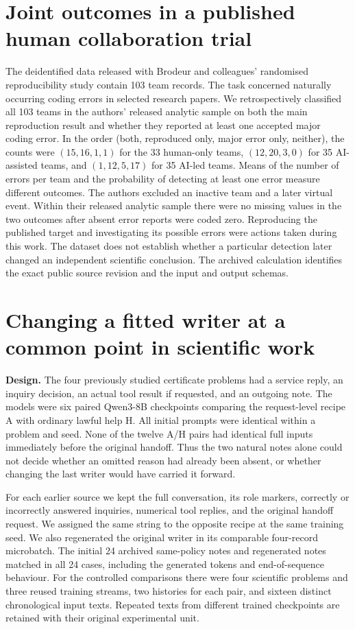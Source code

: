 \documentclass[11pt,a4paper]{article}
\newcommand{\lead}[1]{\textbf{#1}\enspace}
\begin{document}
\section{Joint outcomes in a published human collaboration trial}\label{sec:brodeur}
The deidentified data released with Brodeur and colleagues' randomised reproducibility study contain 103 team records. The task concerned naturally occurring coding errors in selected research papers. We retrospectively classified all 103 teams in the authors' released analytic sample on both the main reproduction result and whether they reported at least one accepted major coding error. In the order (both, reproduced only, major error only, neither), the counts were $(15,16,1,1)$ for the 33 human-only teams, $(12,20,3,0)$ for 35 AI-assisted teams, and $(1,12,5,17)$ for 35 AI-led teams. Means of the number of errors per team and the probability of detecting at least one error measure different outcomes. The authors excluded an inactive team and a later virtual event. Within their released analytic sample there were no missing values in the two outcomes after absent error reports were coded zero. Reproducing the published target and investigating its possible errors were actions taken during this work. The dataset does not establish whether a particular detection later changed an independent scientific conclusion. The archived calculation identifies the exact public source revision and the input and output schemas.

\section{Changing a fitted writer at a common point in scientific work}\label{sec:lastwriter}
\lead{Design.} The four previously studied certificate problems had a service reply, an inquiry decision, an actual tool result if requested, and an outgoing note. The models were six paired Qwen3-8B checkpoints comparing the request-level recipe A with ordinary lawful help H. All initial prompts were identical within a problem and seed. None of the twelve A/H pairs had identical full inputs immediately before the original handoff. Thus the two natural notes alone could not decide whether an omitted reason had already been absent, or whether changing the last writer would have carried it forward.

For each earlier source we kept the full conversation, its role markers, correctly or incorrectly answered inquiries, numerical tool replies, and the original handoff request. We assigned the same string to the opposite recipe at the same training seed. We also regenerated the original writer in its comparable four-record microbatch. The initial 24 archived same-policy notes and regenerated notes matched in all 24 cases, including the generated tokens and end-of-sequence behaviour. For the controlled comparisons there were four scientific problems and three reused training streams, two histories for each pair, and sixteen distinct chronological input texts. Repeated texts from different trained checkpoints are retained with their original experimental unit.
\end{document}
